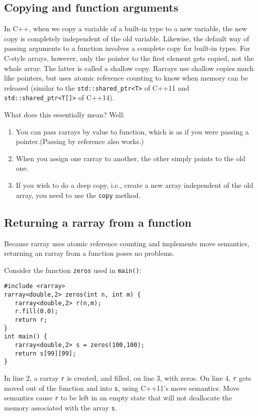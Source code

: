 \documentclass[11pt,twoside]{article}
\begin{document}
\subsection{Copying and function arguments}

In C++, when we copy a variable of a built-in type to a new variable,
the new copy is completely independent of the old variable. Likewise,
the default way of passing arguments to a function involves a complete
copy for built-in types.  For C-style arrays, however, only the
pointer to the first element gets copied, not the whole array. The
latter is called a shallow copy. Rarrays use shallow copies much like
pointers, but uses atomic reference counting to know when memory can
be released (similar to the \texttt{std::shared\_ptr<T>} of C++11 and
\texttt{std::shared\_ptr<T[]>} of C++14). 

What does this essentially mean? Well:
\begin{enumerate}
\item You can pass rarrays by value to function, which is as if you
  were passing a pointer.\linebreak (Passing by reference also works.)
\item When you assign one rarray to another, the other simply points to the old one.
\item If you wish to do a deep copy, i.e., create a new array independent of the old array, you need to use the \texttt{copy} method.
\end{enumerate}

\subsection{Returning a rarray from a function\label{returnvalues}}

Because rarray uses atomic reference counting and implements move semantics, returning an rarray from a
function poses no problems.

Consider the function \texttt{zeros} used in \texttt{main()}:
\vspace{-9pt}
\begin{framed}\vspace{-12pt}%
\begin{verbatim}
#include <rarray>
rarray<double,2> zeros(int n, int m) {
   rarray<double,2> r(n,m);
   r.fill(0.0);
   return r;
}
int main() {
   rarray<double,2> s = zeros(100,100);
   return s[99][99];
}
\end{verbatim}%
\vspace{-12pt}
\end{framed}\vspace{-8pt}
In line 2, a rarray \texttt{r} is created, and filled, on line 3, with
zeros. On line 4, \texttt{r} gets moved out of
the function and into \texttt{s}, using C++11's move
semantics. Move semantics cause \texttt{r} to be left in an empty state
that will not deallocate the memory associated with the array \texttt{s}.
\end{document}
